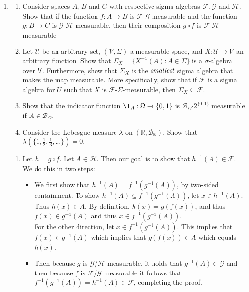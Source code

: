 \begin{enumerate}[resume*]
    \item %
    \begin{enumerate}
        \item \label{ex:mble_comp_is_mble} Consider spaces $A$, $B$ and $C$ with respective sigma algebras $\mathcal{F}, \mathcal{G}$ and $\mathcal{H}$. Show that if the function $f: A \rightarrow B$ is $\mathcal{F}$-$\mathcal{G}$-measurable and the function $g: B \rightarrow C$ is $\mathcal{G}$-$\mathcal{H}$ measurable, then their composition $g \circ f$ is $\mathcal{F}$-$\mathcal{H}$-measurable.
        \item Let $\mathcal{U}$ be an arbitrary set, $(\mathcal{V}, \Sigma)$ a measurable space, and $X: \mathcal{U} \rightarrow \mathcal{V}$ an arbitrary function. Show that $\Sigma_X = \{X^{-1}(A): A \in \Sigma\}$ is a $\sigma$-algebra over $\mathcal{U}$. Furthermore, show that $\Sigma_X$ is the $\emph{smallest}$ sigma algebra that makes the map measurable. More specifically, show that if $\mathcal{F}$ is a sigma algebra for $U$ such that $X$ is $\mathcal{F}$-$\Sigma$-measurable, then $\Sigma_X \subseteq \mathcal{F}$.
        \item Show that the indicator function $\I_A: \Omega \rightarrow \{0,1\}$ is $\mathcal{B}_{\Omega}$-$2^{\{0,1\}}$ measurable if $A \in \mathcal{B}_{\Omega}$.
        \item Consider the Lebesgue measure $\lambda$ on $(\mathbb{R}, \mathcal{B}_{\mathbb{R}})$. Show that $\lambda(\{1, \frac{1}{2}, \frac{1}{3}, \dots\})=0$.
    \end{enumerate}
    \begin{ungradedsolution}
        \begin{enumerate}
            \item Let $h = g \circ f$. Let $A \in \mathcal{H}$. Then our goal is to show that $h^{-1}(A) \in \mathcal{F}$. We do this in two steps:
            \begin{itemize}
                \item We first show that $h^{-1}(A) = f^{-1}(g^{-1}(A))$, by two-sided containment. To show $h^{-1}(A) \subseteq f^{-1}(g^{-1}(A))$, let $x \in h^{-1}(A)$. Thus $h(x) \in A$. By definition, $h(x) = g(f(x))$, and thus $f(x) \in g^{-1}(A)$ and thus $x \in f^{-1}(g^{-1}(A))$.\\
                For the other direction, let $x \in f^{-1}(g^{-1}(A))$. This implies that $f(x) \in g^{-1}(A)$ which implies that $g(f(x)) \in A$ which equals $h(x)$.
                \item Then because $g$ is $\mathcal{G}/\mathcal{H}$ measurable, it holds that $g^{-1}(A) \in \mathcal{G}$ and then because $f$ is $\mathcal{F}/\mathcal{G}$ measurable it follows that $f^{-1}(g^{-1}(A)) = h^{-1}(A) \in \mathcal{F}$, completing the proof.

\end{itemize}
\end{enumerate}
\end{ungradedsolution}
\end{enumerate}
